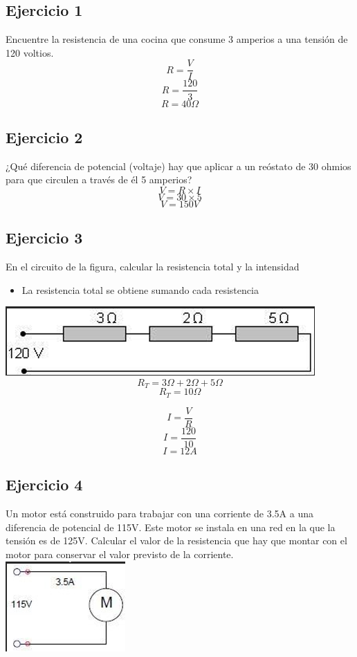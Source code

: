 \documentclass[stu, 12pt, letterpaper, donotrepeattitle, floatsintext, natbib, helv]{apa7}
\begin{document}
\subsection{Ejercicio 1}
\noindent Encuentre la resistencia de una cocina que consume 3 amperios a una tensión de 120 voltios. \\
\[R = \frac{V}{I}\]
\[R = \frac{120}{3}\]
\[R = 40\Omega\]
\subsection{Ejercicio 2}
\noindent ¿Qué diferencia de potencial (voltaje) hay que aplicar a un reóstato de 30 ohmios para que circulen a través de él 5 amperios?
\[V = R \times I\]
\[V = 30 \times 5\]
\[V = 150V\]
\subsection{Ejercicio 3}
\noindent En el circuito de la figura, calcular la resistencia total y la intensidad 
\begin{itemize}
    \item La resistencia total se obtiene sumando cada resistencia
\end{itemize}
\includegraphics{Problem3.png}
\[R_T = 3\Omega + 2\Omega + 5\Omega\]
\[R_T = 10\Omega\]

\[I = \frac{V}{R}\]
\[I = \frac{120}{10}\]
\[I = 12A\]
\subsection{Ejercicio 4}
Un motor está construido para trabajar con una corriente de 3.5A a una diferencia de potencial de 115V. Este motor se instala en una red en la que la tensión es de 125V. Calcular el valor de la resistencia que hay que montar con el motor para conservar el valor previsto de la corriente. \\
\includegraphics{Problem4.png}
\end{document}
